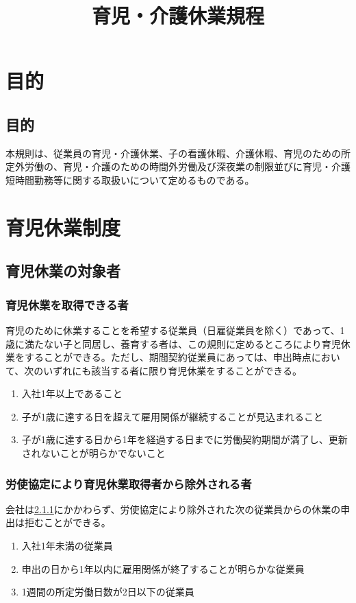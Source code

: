 \documentclass{jsarticle}
\begin{document}
\title{育児・介護休業規程}
\author{}
\date{}
\maketitle

\section{目的}

\subsection{目的}
本規則は、従業員の育児・介護休業、子の看護休暇、介護休暇、育児のための所定外労働の、育児・介護のための時間外労働及び深夜業の制限並びに育児・介護短時間勤務等に関する取扱いについて定めるものである。

\section{育児休業制度}
\label{育介_章_育児休業制度}

\subsection{育児休業の対象者}
\label{育介_条_育児休業の対象者}

\subsubsection{育児休業を取得できる者}
\label{育介_項_育児休業を取得できる者}
育児のために休業することを希望する従業員（日雇従業員を除く）であって、1歳に満たない子と同居し、養育する者は、この規則に定めるところにより育児休業をすることができる。ただし、期間契約従業員にあっては、申出時点において、次のいずれにも該当する者に限り育児休業をすることができる。
\begin{enumerate}
  \item 入社1年以上であること
  \item 子が1歳に達する日を超えて雇用関係が継続することが見込まれること
  \item 子が1歳に達する日から1年を経過する日までに労働契約期間が満了し、更新されないことが明らかでないこと
\end{enumerate}

\subsubsection{労使協定により育児休業取得者から除外される者}
\label{育介_項_労使協定により育児休業取得者から除外される者}
会社は\ref{育介_項_育児休業を取得できる者}にかかわらず、労使協定により除外された次の従業員からの休業の申出は拒むことができる。
\begin{enumerate}
  \item 入社1年未満の従業員
  \item 申出の日から1年以内に雇用関係が終了することが明らかな従業員
  \item 1週間の所定労働日数が2日以下の従業員
\end{enumerate}
\end{document}
